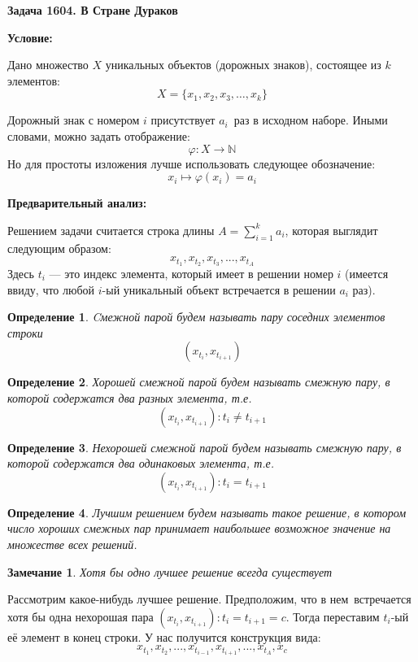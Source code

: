 \documentclass{article}
\begin{document}
  \textbf{Задача 1604. В Стране Дураков}
   
  \textbf{Условие:}
   
   Дано множество \(X\) уникальных объектов (дорожных знаков), состоящее из \(k\) элементов:
   \[
   X = \{x_1, x_2, x_3, \ldots, x_k\}
   \]
   
   Дорожный знак с номером \(i\) присутствует \(a_i\) раз в исходном наборе. Иными словами, можно задать отображение:
   \[
   \varphi: X \longrightarrow \mathbb{N}
   \]
   Но для простоты изложения лучше использовать следующее обозначение:
   \[
   x_i \longmapsto \varphi(x_i) = a_i
   \]
  
   \textbf{Предварительный анализ:}
   
   Решением задачи считается строка длины \(A = \sum\limits_{i=1}^k a_i\), которая выглядит следующим образом:
   \[
   x_{t_1}, x_{t_2}, x_{t_3}, ..., x_{t_A}
   \]
   Здесь \(t_i\) --- это индекс элемента, который имеет в решении номер \(i\) (имеется ввиду, что любой \(i\)-ый уникальный объект встречается в решении \(a_i\) раз).
   
   \newtheorem{Def}{Определение}
   \begin{Def}
   	Cмежной парой будем называть пару соседних элементов строки
   	\[ ( x_{t_{i}}, x_{t_{i+1}} )\]
   \end{Def}
   
   \begin{Def}
   	Хорошей смежной парой будем называть смежную пару, в которой содержатся два разных элемента, т.е.
   	\[ ( x_{t_{i}}, x_{t_{i+1}} ) :  t_{i} \neq t_{i+1} \]
   \end{Def}
   
   \begin{Def}
   	Нехорошей смежной парой будем называть смежную пару, в которой содержатся два одинаковых элемента, т.е.
   	\[ ( x_{t_{i}}, x_{t_{i+1}} ) :  t_{i} = t_{i+1} \]
   \end{Def}
   
   \begin{Def}
    Лучшим решением будем называть такое решение, в котором число хороших смежных пар принимает наибольшее возможное значение на множестве всех решений.
   \end{Def}
   \newtheorem{Comment}{Замечание}
   \begin{Comment}
   	Хотя бы одно лучшее решение всегда существует
   \end{Comment}
   
   
   Рассмотрим какое-нибудь лучшее решение. Предположим, что в нем встречается хотя бы одна нехорошая пара \( ( x_{t_{i}}, x_{t_{i+1}} ) :  t_{i} = t_{i+1} = c \). Тогда переставим \(t_i\)-ый её элемент в конец строки. У нас получится конструкция вида:
   \[
   x_{t_1}, x_{t_2}, ..., x_{t_{i-1}}, x_{t_{i+1}}, ..., x_{t_A}, x_c
   \]
   
\end{document}
